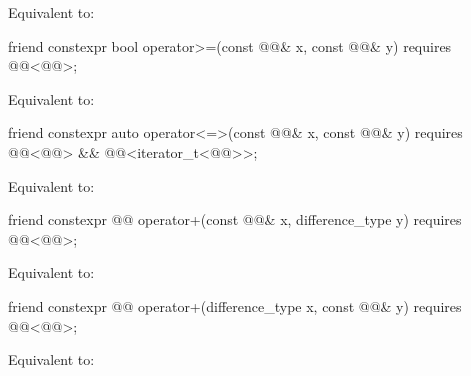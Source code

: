 \begin{itemdescr}
\pnum
\effects
Equivalent to: 
\end{itemdescr}

%
\begin{itemdecl}
friend constexpr bool operator>=(const @@& x, const @@& y)
  requires @@<@@>;
\end{itemdecl}

\begin{itemdescr}
\pnum
\effects
Equivalent to: 
\end{itemdescr}

%
\begin{itemdecl}
friend constexpr auto operator<=>(const @@& x, const @@& y)
  requires @@<@@> && @@<iterator_t<@@>>;
\end{itemdecl}

\begin{itemdescr}
\pnum
\effects
Equivalent to: 
\end{itemdescr}

%
\begin{itemdecl}
friend constexpr @@ operator+(const @@& x, difference_type y)
  requires @@<@@>;
\end{itemdecl}

\begin{itemdescr}
\pnum
\effects
Equivalent to: 
\end{itemdescr}

%
\begin{itemdecl}
friend constexpr @@ operator+(difference_type x, const @@& y)
  requires @@<@@>;
\end{itemdecl}

\begin{itemdescr}
\pnum
\effects
Equivalent to: 
\end{itemdescr}

